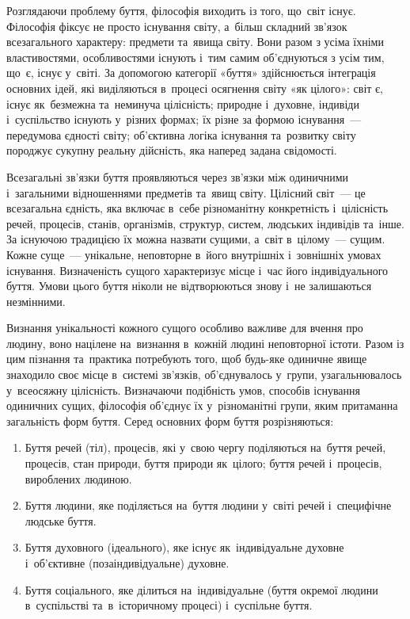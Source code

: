 \documentclass[a5paper,oneside,DIV=12,12pt,headings=small]{scrartcl}
\begin{document}
		Розглядаючи проблему буття, філософія виходить із того, що~світ існує. Філософія фіксує не просто існування світу, а~більш складний зв'язок всезагального характеру: предмети та~явища світу. Вони разом з усіма їхніми властивостями, особливостями існують і~тим самим об'єднуються з усім тим, що~є, існує у~світі. За допомогою категорії «буття» здійснюється інтеграція основних ідей, які виділяються в~процесі осягнення світу «як цілого»: світ є, існує як~безмежна та~неминуча цілісність; природне і~духовне, індивіди і~суспільство існують у~різних формах; їх різне за формою існування~— передумова єдності світу; об'єктивна логіка існування та~розвитку світу породжує сукупну реальну дійсність, яка наперед задана свідомості.
		
		Всезагальні зв'язки буття проявляються через зв'язки між одиничними і~загальними відношеннями предметів та~явищ світу. Цілісний світ~— це всезагальна єдність, яка включає в~себе різноманітну конкретність і~цілісність речей, процесів, станів, організмів, структур, систем, людських індивідів та~інше. За існуючою традицією їх можна назвати сущими, а~світ в~цілому~— сущим. Кожне суще~— унікальне, неповторне в~його внутрішніх і~зовнішніх умовах існування. Визначеність сущого характеризує місце і~час його індивідуального буття. Умови цього буття ніколи не відтворюються знову і~не залишаються незмінними.
		
		Визнання унікальності кожного сущого особливо важливе для вчення про людину, воно націлене на~визнання в~кожній людині неповторної істоти. Разом із цим пізнання та~практика потребують того, щоб будь-яке одиничне явище знаходило своє місце в~системі зв'язків, об'єднувалось у~групи, узагальнювалось у~всеосяжну цілісність. Визначаючи подібність умов, способів існування одиничних сущих, філософія об'єднує їх у~різноманітні групи, яким притаманна загальність форм буття. Серед основних форм буття розрізняються:
		\begin{enumerate}
			\item Буття речей (тіл), процесів, які у~свою чергу поділяються на~буття речей, процесів, стан природи, буття природи як~цілого; буття речей і~процесів, вироблених людиною.
			\item Буття людини, яке поділяється на~буття людини у~світі речей і~специфічне людське буття.
			\item Буття духовного (ідеального), яке існує як~індивідуальне духовне і~об'єктивне (позаіндивідуальне) духовне.
			\item Буття соціального, яке ділиться на~індивідуальне (буття окремої людини в~суспільстві та~в~історичному процесі) і~суспільне буття.
		\end{enumerate}
		
\end{document}
